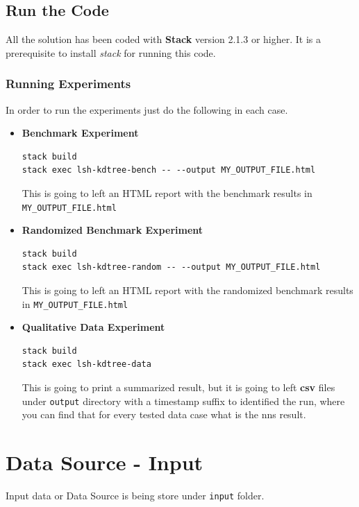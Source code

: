 \documentclass[12pt, a4paper]{article}
\begin{document}
\subsection{Run the Code}
All the solution has been coded with \textbf{Stack} \cite{stack} version 2.1.3 or higher. It is a prerequisite to install \textit{stack} for running this code.

\subsubsection{Running Experiments}
In order to run the experiments just do the following in each case.

\begin{itemize}
  \item \textbf{Benchmark Experiment}

\begin{verbatim}
stack build
stack exec lsh-kdtree-bench -- --output MY_OUTPUT_FILE.html
\end{verbatim}

This is going to left an HTML report with the benchmark results in \texttt{MY_OUTPUT_FILE.html}

\item \textbf{Randomized Benchmark Experiment}

\begin{verbatim}
stack build
stack exec lsh-kdtree-random -- --output MY_OUTPUT_FILE.html
\end{verbatim}

This is going to left an HTML report with the randomized benchmark results in \texttt{MY_OUTPUT_FILE.html}


\item \textbf{Qualitative Data Experiment}

\begin{verbatim}
stack build
stack exec lsh-kdtree-data
\end{verbatim}

This is going to print a summarized result, but it is going to left \textbf{csv} files under \texttt{output} directory with a timestamp suffix to identified the run, where you can find that for every tested data case what is the \acrshort{nns} result.

\end{itemize}

\section{Data Source - Input}\label{apx:data}
Input data or Data Source is being store under \texttt{input} folder.
\end{document}
